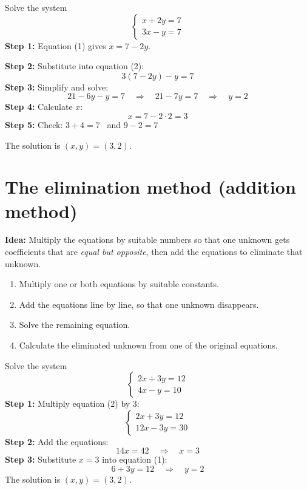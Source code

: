\begin{exempel}
Solve the system
\[
  \begin{cases}
    x + 2y = 7 \\
    3x - y = 7
  \end{cases}
\]
\textbf{Step 1:} Equation (1) gives $x = 7 - 2y$.
\par\noindent\textbf{Step 2:} Substitute into equation (2):
\[
  3(7 - 2y) - y = 7
\]
\textbf{Step 3:} Simplify and solve:
\[
  21 - 6y - y = 7 \quad \Rightarrow \quad 21 - 7y = 7 \quad \Rightarrow \quad y = 2
\]
\textbf{Step 4:} Calculate $x$:
\[
  x = 7 - 2 \cdot 2 = 3
\]
\textbf{Step 5:} Check: $3 + 4 = 7$~\checkmark{} and $9 - 2 = 7$~\checkmark
\par\noindent The solution is $(x, y) = (3, 2)$.
\end{exempel}

\section{The elimination method (addition method)}
\label{c4:sec:addition}
\textbf{Idea:} Multiply the equations by suitable numbers so that one unknown gets coefficients
that are \emph{equal but opposite}, then add the equations to eliminate that unknown.
\begin{enumerate}
  \item Multiply one or both equations by suitable constants.
  \item Add the equations line by line, so that one unknown disappears.
  \item Solve the remaining equation.
  \item Calculate the eliminated unknown from one of the original equations.
\end{enumerate}

\begin{exempel}
Solve the system
\[
  \begin{cases}
    2x + 3y = 12 \\
    4x - y = 10
  \end{cases}
\]
\textbf{Step 1:} Multiply equation (2) by $3$:
\[
  \begin{cases}
    2x + 3y = 12 \\
    12x - 3y = 30
  \end{cases}
\]
\textbf{Step 2:} Add the equations:
\[
  14x = 42 \quad \Rightarrow \quad x = 3
\]
\textbf{Step 3:} Substitute $x = 3$ into equation (1):
\[
  6 + 3y = 12 \quad \Rightarrow \quad y = 2
\]
The solution is $(x, y) = (3, 2)$.
\end{exempel}

